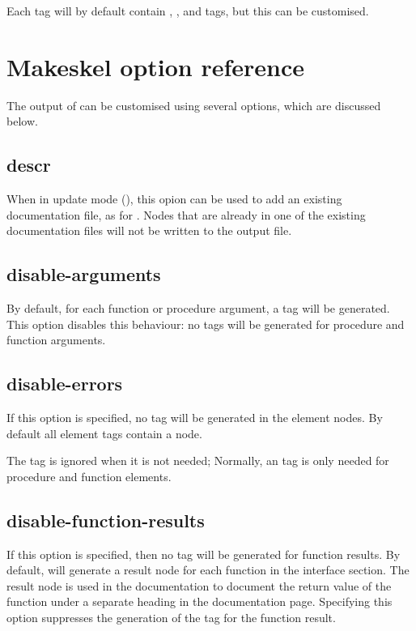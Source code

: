 Each  tag will by default contain , ,
 and  tags, but this can be customised.

\section{Makeskel option reference}
\label{se:makeskeloption}
The output of  can be customised using several options, which
are discussed below.

\subsection{descr}
When in update mode (), this opion can be used to add an
existing documentation file, as for . Nodes that are already 
in one of the existing documentation files will not be written to the 
output file.

\subsection{disable-arguments}
\label{suse:msdisablearguments}
By default, for each function or procedure argument, a  tag will
be generated. This option disables this behaviour: no  tags
will be generated for procedure and function arguments.

\subsection{disable-errors}
\label{suse:msdisableerrors}
If this option is specified, no  tag will be generated in the
element nodes. By default all element tags contain a  node.

The  tag is ignored when it is not needed; Normally, an 
 tag is only needed for procedure and function elements.

\subsection{disable-function-results}
\label{suse:disablefunctionresults}
If this option is specified, then no  tag will be generated for
function results. By default,  will generate a result node
for each function in the interface section. The result node is used in the
documentation to document the return value of the function under a separate
heading in the documentation page. Specifying this option suppresses the
generation of the  tag for the function result.

